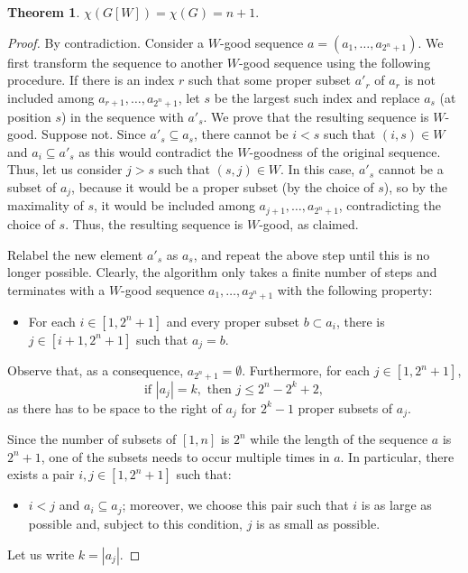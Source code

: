 \documentclass{article}
\newtheorem{theorem}{Theorem}
\newcommand{\size}[1]{\left|#1\right|}
\begin{document}
\begin{theorem}\label{t:crit-all}
  $\chi(G[W]) = \chi(G) = n+1.$
\end{theorem}
\begin{proof}
  By contradiction. Consider a $W$-good sequence
  $a = (a_1,\dots,a_{2^n+1})$. We first transform the sequence to another
  $W$-good sequence using the following procedure. If there is an
  index $r$ such that some proper subset $a'_r$ of $a_r$ is not
  included among $a_{r+1},\dots,a_{2^n+1}$, let $s$ be the largest
  such index and replace $a_s$ (at position $s$) in the sequence with
  $a'_s$. We prove that the resulting sequence is $W$-good. Suppose
  not. Since $a'_s\subseteq a_s$, there cannot be $i < s$ such that
  $(i,s)\in W$ and $a_i\subseteq a'_s$ as this would contradict the
  $W$-goodness of the original sequence. Thus, let us consider $j > s$
  such that $(s,j)\in W$. In this case, $a'_s$ cannot be a subset of
  $a_j$, because it would be a proper subset (by the choice of $s$),
  so by the maximality of $s$, it would be included among
  $a_{j+1},\dots,a_{2^n+1}$, contradicting the choice of $s$. Thus,
  the resulting sequence is $W$-good, as claimed.

  Relabel the new element $a'_s$ as $a_s$, and repeat the above step
  until this is no longer possible. Clearly, the
  algorithm only takes a finite number of steps and terminates with a
  $W$-good sequence $a_1,\dots,a_{2^n+1}$ with the following property:
  \begin{itemize}
  \item[] For each $i\in [1,2^n+1]$ and every proper subset $b \subset a_i$, there is $j \in [i+1,2^n+1]$ such that $a_j = b$.
  \end{itemize}
 
  Observe that, as a
  consequence, $a_{2^n+1} = \emptyset$. Furthermore, for each
  $j\in[1,2^n+1]$,
  \begin{equation}
    \label{eq:1}
    \text{if }\size{a_j} = k, \text{ then } j \leq 2^n - 2^k + 2,
  \end{equation}
  as there has to be space to the right of $a_j$ for $2^k-1$ proper
  subsets of $a_j$.

  Since the number of subsets of $[1,n]$ is $2^n$ while the length of the sequence
  $a$ is $2^n+1$, one of the subsets needs to occur multiple times in $a$. In particular, there exists a pair $i,j\in [1,2^n+1]$
  such that:
  \begin{itemize} 
    \item[] $i < j$ and $a_i \subseteq a_j$; moreover, we choose this pair
  such that $i$ is as large as possible and, subject to this condition, $j$ is as small as possible.
  \end{itemize}
  Let us write $k = \size{a_j}$. 


\end{proof}
\end{document}
